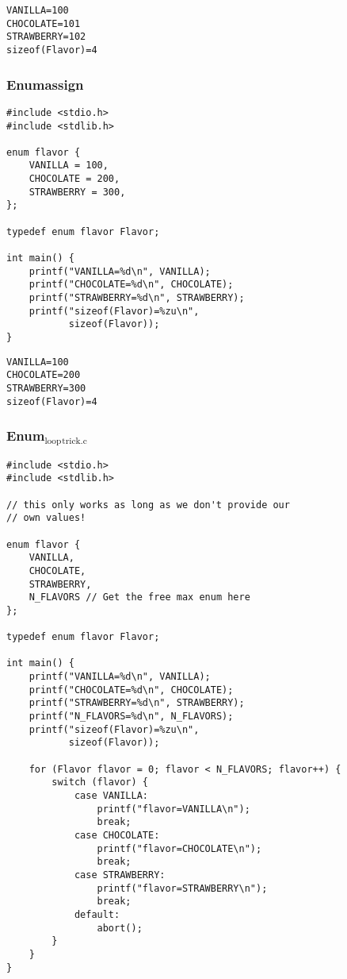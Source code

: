 \documentclass[11pt]{article}
\begin{document}
\begin{verbatim}
VANILLA=100
CHOCOLATE=101
STRAWBERRY=102
sizeof(Flavor)=4
\end{verbatim}

\subsubsection{Enumassign}
\label{sec:orgaf42ecd}

\begin{verbatim}
#include <stdio.h>
#include <stdlib.h>

enum flavor {
    VANILLA = 100,
    CHOCOLATE = 200,
    STRAWBERRY = 300,
};

typedef enum flavor Flavor;

int main() {
    printf("VANILLA=%d\n", VANILLA);
    printf("CHOCOLATE=%d\n", CHOCOLATE);
    printf("STRAWBERRY=%d\n", STRAWBERRY);
    printf("sizeof(Flavor)=%zu\n",
           sizeof(Flavor));
}
\end{verbatim}

\begin{verbatim}
VANILLA=100
CHOCOLATE=200
STRAWBERRY=300
sizeof(Flavor)=4
\end{verbatim}

\subsubsection{Enum\(_{\text{loop}}\)\(_{\text{trick.c}}\)}
\label{sec:org8cc79ec}

\begin{verbatim}
#include <stdio.h>
#include <stdlib.h>

// this only works as long as we don't provide our
// own values!

enum flavor {
    VANILLA,
    CHOCOLATE,
    STRAWBERRY,
    N_FLAVORS // Get the free max enum here
};

typedef enum flavor Flavor;

int main() {
    printf("VANILLA=%d\n", VANILLA);
    printf("CHOCOLATE=%d\n", CHOCOLATE);
    printf("STRAWBERRY=%d\n", STRAWBERRY);
    printf("N_FLAVORS=%d\n", N_FLAVORS);
    printf("sizeof(Flavor)=%zu\n",
           sizeof(Flavor));

    for (Flavor flavor = 0; flavor < N_FLAVORS; flavor++) {
        switch (flavor) {
            case VANILLA:
                printf("flavor=VANILLA\n");
                break;
            case CHOCOLATE:
                printf("flavor=CHOCOLATE\n");
                break;
            case STRAWBERRY:
                printf("flavor=STRAWBERRY\n");
                break;
            default:
                abort();
        }
    }
}
\end{verbatim}
\end{document}
